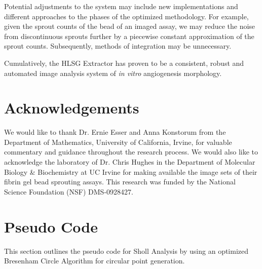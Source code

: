 \documentclass{sig-alternate}
\newcommand{\invitro}{\emph{in vitro} }
\begin{document}
	Potential adjustments to the system may include new implementations
	and different approaches to the phases of the optimized methodology.
	For example, given the sprout counts of the bead of an imaged assay,
	we may reduce the noise from discontinuous sprouts further by a
	piecewise constant approximation of the sprout counts. Subsequently,
	methods of integration may be unnecessary. 

	Cumulatively, the HLSG Extractor has proven to be a consistent, robust
	and automated image analysis system of \invitro angiogenesis
	morphology.

\section{Acknowledgements} %
\label{sec:Acknowledgements}
	We would like to thank Dr. Ernie Esser and Anna Konstorum from the
	Department of Mathematics, University of California, Irvine, for
	valuable commentary and guidance throughout the research process. We
	would also like to acknowledge the laboratory of Dr. Chris Hughes in
	the Department of Molecular Biology \& Biochemistry at UC Irvine for
	making available the image sets of their fibrin gel bead sprouting
	assays. This research was funded by the National Science Foundation
	(NSF) DMS-0928427.




\appendix
\section{Pseudo Code} %
\label{sec:Pseudo Code}
	This section outlines the pseudo code for Sholl Analysis by using an
	optimized Bresenham Circle Algorithm for circular point generation.
\end{document}
